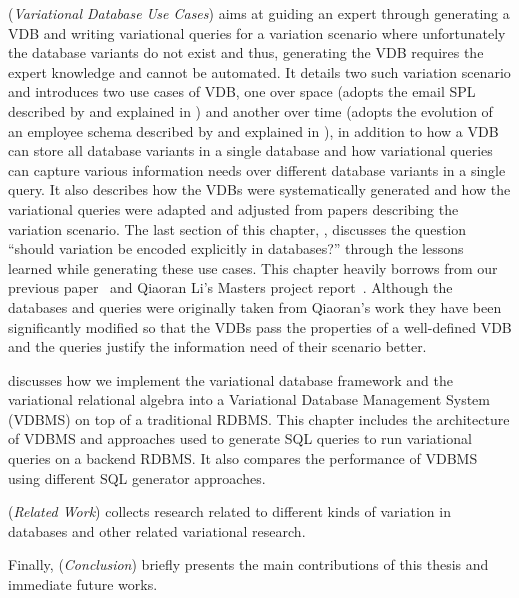  (\emph{Variational Database Use Cases}) 
aims at guiding an expert through generating a VDB and writing
variational queries for a variation scenario where unfortunately the database variants
do not exist and thus, generating the VDB requires the expert knowledge and cannot
be automated. 
%
It details two such variation scenario and introduces two use cases of VDB, one over space
(adopts the email SPL described by \citet{Hall05} and explained in )
 and another over time (adopts the evolution 
of an employee schema described by \citet{prima08Moon} and explained in ), 
in addition to how a VDB can store all database variants in a single database and
 how variational queries can capture various information needs over different database variants
in a single query. It also describes how  the VDBs were systematically 
generated and how the variational queries
were adapted and adjusted from papers describing the variation scenario. 
%
The last section of this chapter, , discusses the question 
``should variation be encoded explicitly in databases?'' through the lessons learned 
while generating these use cases. This chapter heavily borrows from our previous paper~\cite{ALW21vamos} and Qiaoran Li's Masters project report~\cite{Li19}. 
Although the databases and queries were originally taken from Qiaoran's work they 
have been significantly modified  so that the VDBs pass the properties of a well-defined VDB and 
the queries justify the information need of their scenario better. 


 discusses how we implement 
the variational database framework and the variational relational
algebra into a Variational Database Management System (VDBMS) on top of
a traditional RDBMS. This chapter 
includes the architecture of VDBMS and approaches used to generate SQL
queries to run variational queries on a backend RDBMS. It also compares the
performance of VDBMS using different SQL generator approaches. 


 (\emph{Related Work}) collects research related to different kinds of variation 
in databases and other related variational research. 

Finally,  (\emph{Conclusion}) briefly presents the main contributions 
of this thesis and immediate future works. 

